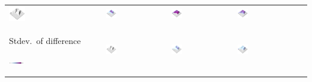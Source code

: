 \documentclass[Afour,sageh,times]{sagej}
\begin{document}
\begin{table}[h]
\begin{tabular}{m{} m{} m{} m{} m{}}
\includegraphics[width=0.18\textwidth]{images/render_3d/participants/dem_difference_1.png} &
\includegraphics[width=0.18\textwidth]{images/render_3d/participants/stdev_dem_1.png} &
\includegraphics[width=0.18\textwidth]{images/render_3d/participants/stdev_dem_2.png} &
\includegraphics[width=0.18\textwidth]{images/render_3d/participants/stdev_dem_3.png}\\
%
Stdev.~of difference \par \vspace{0.5em} \includegraphics[width=0.16\textwidth]{images/legends/stdev_diff_legend.pdf} & 
\includegraphics[width=0.18\textwidth]{images/render_3d/participants/dem_difference_1.png} &
\includegraphics[width=0.18\textwidth]{images/render_3d/participants/stdev_regression_difference_series_1.png} &
\includegraphics[width=0.18\textwidth]{images/render_3d/participants/stdev_regression_difference_series_2.png} &

\end{tabular}
\end{table}
\end{document}
